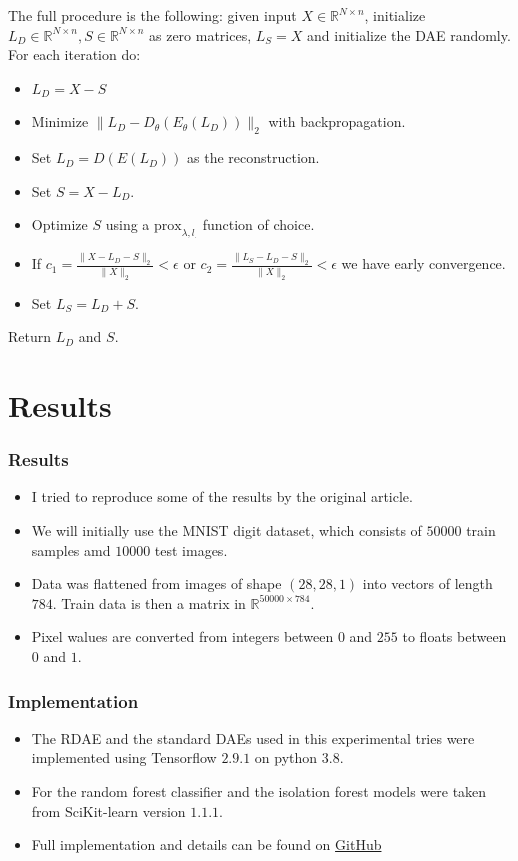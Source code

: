 \documentclass{beamer}
\theoremstyle{plain}
\theoremstyle{definition}
\theoremstyle{remark}
\newcommand{\R}{\mathbb{R}}
\newcommand{\norm}[1]{\lVert#1\rVert}
\newcommand{\prox}{\text{prox}}
\begin{document}
\begin{frame}
	The full procedure is the following: given input $X\in \R^{N\times n}$, initialize $L_D\in \R^{N\times n}, S\in \R^{N\times n}$ as zero matrices, 
	$L_S = X$ and initialize the DAE randomly. For each iteration do:
	\begin{itemize}
		\item $L_D = X - S$
		\item Minimize $\norm{L_D -D_{\theta}(E_{\theta}(L_D))}_2$ with backpropagation.
		\item Set $L_D = D(E(L_D))$ as the reconstruction.
		\item Set $S = X - L_D$.
		\item Optimize $S$ using a $\prox_{\lambda, l_{\cdot}}$ function of choice.
		\item If $c_1 = \frac{\norm{X-L_D-S}_2}{\norm{X}_2} < \epsilon$ or $c_2 = \frac{\norm{L_S-L_D-S}_2}{\norm{X}_2} < \epsilon$ we have early convergence.
		\item Set $L_S = L_D + S$.
	\end{itemize}
	Return $L_D$ and $S$.
\end{frame}

\section{Results}

\begin{frame}
	\frametitle{Results}
	\begin{itemize}
		\item I tried to reproduce some of the results by the original article.
		\item We will initially use the MNIST digit dataset, which consists of $50000$ train samples amd $10000$ test images.
		\item Data was flattened from images of shape $(28,28,1)$ into vectors of length $784$. Train data is then a matrix in $\R^{50000\times 784}$.
		\item Pixel walues are converted from integers between $0$ and $255$ to floats between $0$ and $1$.
	\end{itemize}
\end{frame}

\begin{frame}
	\frametitle{Implementation}
	\begin{itemize}
		\item The RDAE and the standard DAEs used in this experimental tries were implemented using Tensorflow $2.9.1$ on python $3.8$.
		\item For the random forest classifier and the isolation forest models were taken from SciKit-learn version $1.1.1$.
		\item Full implementation and details can be found on \hyperref{https://github.com/AlexThirty/SaMLMfTSA}{}{}{GitHub}
	\end{itemize}
\end{frame}
\end{document}
